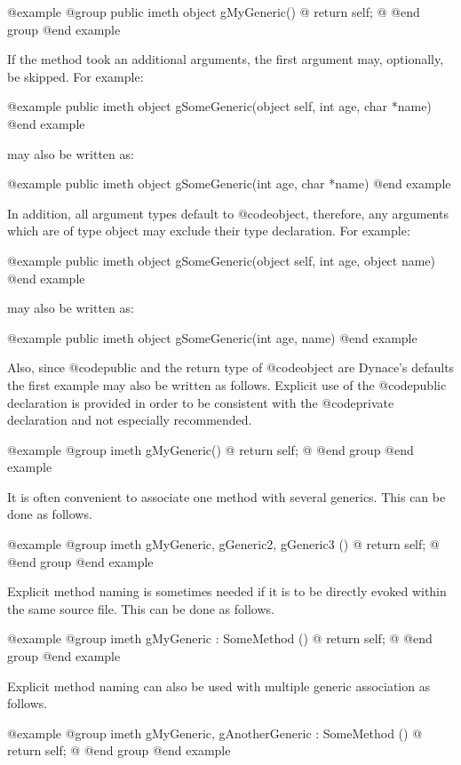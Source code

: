 @example
@group
public  imeth   object  gMyGeneric()
@{
        return self;
@}
@end group
@end example


If the method took an additional arguments, the first argument may,
optionally, be skipped.  For example:

@example
public  imeth   object  gSomeGeneric(object self, int age, char *name)
@end example

may also be written as:

@example
public  imeth   object  gSomeGeneric(int age, char *name)
@end example


In addition, all argument types default to @code{object}, therefore,
any arguments which are of type object may exclude their type
declaration.  For example:

@example
public  imeth   object  gSomeGeneric(object self, int age, object name)
@end example

may also be written as:

@example
public  imeth   object  gSomeGeneric(int age, name)
@end example


Also, since @code{public} and the return type of @code{object} are
Dynace's defaults the first example may also be written as follows.
Explicit use of the @code{public} declaration is provided in order to
be consistent with the @code{private} declaration and not especially
recommended.

@example
@group
imeth   gMyGeneric()
@{
        return self;
@}
@end group
@end example




It is often convenient to associate one method with several generics.
This can be done as follows.

@example
@group
imeth   gMyGeneric, gGeneric2, gGeneric3 ()
@{
        return self;
@}
@end group
@end example


Explicit method naming is sometimes needed if it is to be directly
evoked within the same source file.  This can be done as follows.


@example
@group
imeth   gMyGeneric : SomeMethod ()
@{
        return self;
@}
@end group
@end example



Explicit method naming can also be used with multiple generic
association as follows.

@example
@group
imeth   gMyGeneric, gAnotherGeneric : SomeMethod ()
@{
        return self;
@}
@end group
@end example





